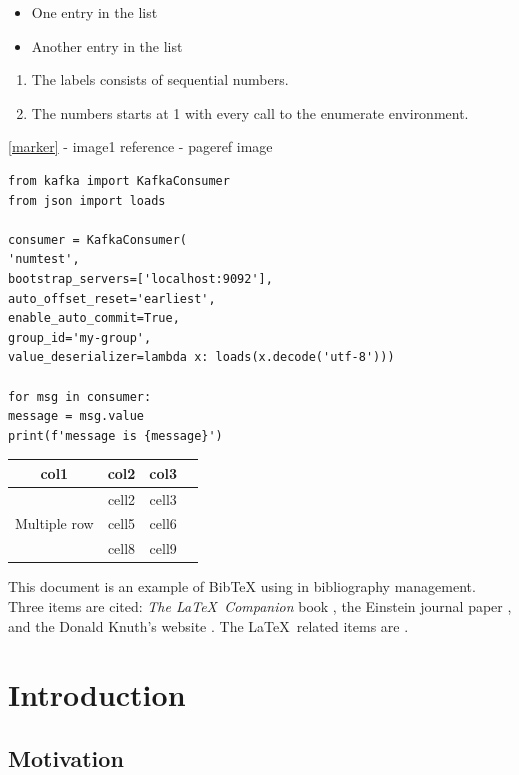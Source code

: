 \documentclass[a4paper,10pt]{article}
\begin{document}
\begin{itemize}
	\item One entry in the list
	\item Another entry in the list
\end{itemize}

\begin{enumerate}
	\item The labels consists of sequential numbers.
	\item The numbers starts at 1 with every call to the enumerate environment.
\end{enumerate}

\ref{marker} - image1 reference
\pageref{marker} - pageref image

\begin{verbatim}
from kafka import KafkaConsumer
from json import loads

consumer = KafkaConsumer(
'numtest',
bootstrap_servers=['localhost:9092'],
auto_offset_reset='earliest',
enable_auto_commit=True,
group_id='my-group',
value_deserializer=lambda x: loads(x.decode('utf-8')))

for msg in consumer:
message = msg.value
print(f'message is {message}')
\end{verbatim}

\begin{center}
	\begin{tabular}{ |c|c|c|c| } 
		\hline
		col1 & col2 & col3 \\
		\hline
		\multirow{3}{4em}{Multiple row} & cell2 & cell3 \\ 
		& cell5 & cell6 \\ 
		& cell8 & cell9 \\ 
		\hline
	\end{tabular}
\end{center}

This document is an example of BibTeX using in bibliography management. Three items 
are cited: \textit{The \LaTeX\ Companion} book \cite{latexcompanion}, the Einstein
journal paper \cite{einstein}, and the Donald Knuth's website \cite{knuthwebsite}. 
The \LaTeX\ related items are \cite{latexcompanion,knuthwebsite}. 

\medskip



    \section{Introduction}
    \subsection{Motivation}
\end{document}
